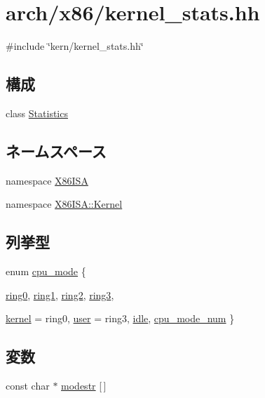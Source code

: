 \hypertarget{arch_2x86_2kernel__stats_8hh}{
\section{arch/x86/kernel\_\-stats.hh}
\label{arch_2x86_2kernel__stats_8hh}
}
{\ttfamily \#include \char`\"{}kern/kernel\_\-stats.hh\char`\"{}}\par
\subsection*{構成}
\begin{DoxyCompactItemize}
\item 
class \hyperlink{classX86ISA_1_1Kernel_1_1Statistics}{Statistics}
\end{DoxyCompactItemize}
\subsection*{ネームスペース}
\begin{DoxyCompactItemize}
\item 
namespace \hyperlink{namespaceX86ISA}{X86ISA}
\item 
namespace \hyperlink{namespaceX86ISA_1_1Kernel}{X86ISA::Kernel}
\end{DoxyCompactItemize}
\subsection*{列挙型}
\begin{DoxyCompactItemize}
\item 
enum \hyperlink{namespaceX86ISA_1_1Kernel_aa1fc3805dac6f71f457fbbc263105bf6}{cpu\_\-mode} \{ \par
\hyperlink{namespaceX86ISA_1_1Kernel_aa1fc3805dac6f71f457fbbc263105bf6acdb76ad549505310e4b0b265f760f0d8}{ring0}, 
\hyperlink{namespaceX86ISA_1_1Kernel_aa1fc3805dac6f71f457fbbc263105bf6ac0cdb2eaed5cb9c65eb487df1c9a5cef}{ring1}, 
\hyperlink{namespaceX86ISA_1_1Kernel_aa1fc3805dac6f71f457fbbc263105bf6a94aafb7dcf01d22546c38ed14b1f0786}{ring2}, 
\hyperlink{namespaceX86ISA_1_1Kernel_aa1fc3805dac6f71f457fbbc263105bf6a1249f2b5eb86b7472f7dd8ead54292e7}{ring3}, 
\par
\hyperlink{namespaceX86ISA_1_1Kernel_aa1fc3805dac6f71f457fbbc263105bf6adb0339d028e596254368234e5ab09f9d}{kernel} =  ring0, 
\hyperlink{namespaceX86ISA_1_1Kernel_aa1fc3805dac6f71f457fbbc263105bf6a04981b8c09a50ccfb1d92fc11b81c36a}{user} =  ring3, 
\hyperlink{namespaceX86ISA_1_1Kernel_aa1fc3805dac6f71f457fbbc263105bf6a0e9a37114c0e458d28d52f06ec0f2242}{idle}, 
\hyperlink{namespaceX86ISA_1_1Kernel_aa1fc3805dac6f71f457fbbc263105bf6a4572f7cf10830e04921c8896f22102ba}{cpu\_\-mode\_\-num}
 \}
\end{DoxyCompactItemize}
\subsection*{変数}
\begin{DoxyCompactItemize}
\item 
const char $\ast$ \hyperlink{namespaceX86ISA_1_1Kernel_aaab5092bc6d1c40a90ff4c7450649ace}{modestr} \mbox{[}$\,$\mbox{]}
\end{DoxyCompactItemize}
